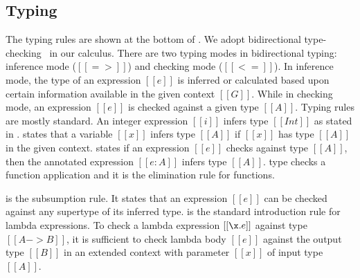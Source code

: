 \subsection{Typing}
\label{sec:union:typ}
The typing rules are shown at the bottom of .
We adopt bidirectional type-checking~\cite{} in our calculus.  There
are two typing modes in bidirectional typing: inference mode
($[[=>]]$) and checking mode ($[[<=]]$). In inference mode, the type of
an expression $[[e]]$ is inferred or calculated based upon certain
information available in the given context $[[G]]$.  While in checking
mode, an expression $[[e]]$ is checked against a given type $[[A]]$.
Typing rules are mostly standard.  An integer
expression $[[i]]$ infers type $[[Int]]$ as stated in .
 states that a variable $[[x]]$ infers type $[[A]]$ if
$[[x]]$ has type $[[A]]$ in the given context.  states
if an expression $[[e]]$ checks against type $[[A]]$, then the
annotated expression $[[e:A]]$ infers type $[[A]]$.
 type checks a function application and it is the
elimination rule for functions.
\begin{comment}
Expression $[[e1]]$ has to
be a function expression and expression $[[e2]]$ has to check against
input type of $[[e1]]$.  An important point to notice in
\rref{typ-app} is $[[e1]]$ infers type $[[A -> B]]$. This may look
weird at the very first glance because lamda expressions ($[[\x.e]]$)
are not annotated in program expressions $[[e]]$ and it seems not
possible for lambda expression to infer its type.  To answer this
question, we emphasize the use of partial expressions $[[p]]$ and
values $[[v]]$.  Lambda expression is annotated in $[[p]]$ and so in
$[[v]]$ because values are defined as annotated partial expressions.
\end{comment}
 is the subsumption rule. It states that an expression
$[[e]]$ can be checked against any supertype of its inferred type.
 is the standard introduction rule for lambda
expressions. To check a lambda expression $[[\x.e]]$ against type $[[A
    -> B]]$, it is sufficient to check lambda body $[[e]]$ against the
output type $[[B]]$ in an extended context with parameter $[[x]]$ of
input type $[[A]]$.

